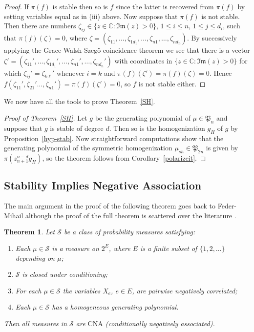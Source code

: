 \documentclass[10pt,reqno]{amsart}
\theoremstyle{plain}
\newtheorem{theorem}{Theorem}[section]
\theoremstyle{definition}
\theoremstyle{remark}
\newcommand{\CNA}{\text{CNA}}
\newcommand{\CC}{\mathbb{C}}
\renewcommand{\Im}{\mathfrak{Im}}
\newcommand{\fP}{\mathfrak{P}}
\begin{document}
\begin{proof}
If $\pi(f)$ is stable then so is $f$ since the latter is recovered from 
$\pi(f)$ by setting variables equal as in (iii) above. Now suppose that 
$\pi(f)$ is not stable. Then there are numbers 
$\zeta_{ij} \in \{z \in \CC : \Im(z)>0\}$, $1 \leq i \leq n$, 
$1 \leq j \leq d_i$, such 
that $\pi(f)(\zeta)=0$, where
$\zeta
=(\zeta_{11},\ldots,\zeta_{1d_1},\ldots,\zeta_{n1},\ldots,\zeta_{nd_n})$.
By successively applying the Grace-Walsh-Szeg\"o coincidence theorem we see 
that there is a vector $\zeta' = 
(\zeta_{11}',\ldots,\zeta_{1d_1}',\ldots,\zeta_{n1}',\ldots,\zeta_{nd_n}')$ 
with coordinates in $\{z \in \CC : \Im(z)>0\}$ for which $\zeta_{ij}'
= \zeta_{k\ell}'$ whenever $i=k$ and $\pi(f)(\zeta')=\pi(f)(\zeta)=0$. Hence 
$f(\zeta_{11}', \zeta_{21}' \ldots, \zeta_{n1}')=\pi(f)(\zeta')=0$, so $f$ is 
not stable either. 
\end{proof}

We now have all the tools to prove Theorem~\ref{SH}. 

\begin{proof}[Proof of Theorem~\ref{SH}]
Let $g$ be the generating polynomial of $\mu\in\fP_n$ and 
suppose that $g$ is stable of degree $d$. 
Then so is the homogenization $g_H$ of $g$ by Proposition~\ref{hyp-stab}. 
Now straightforward computations show that the generating polynomial of 
the symmetric homogenization $\mu_{sh}\in\fP_{2n}$ is given by
 $\pi(z_{n+1}^{n-d}g_H)$, so the theorem follows from 
Corollary~\ref{polarizeit}. 
\end{proof} 

\subsection{Stability Implies Negative Association}\label{s-sna}

The main argument in the proof of the following theorem goes back to 
Feder-Mihail \cite{feder} although the proof of the full theorem is scattered 
over the literature \cite{DJR,Lyons,Lyons-Peres,W}. 

\begin{theorem}\label{FM}
Let $\mathcal{S}$ be a class of probability measures satisfying: 
\begin{enumerate}
\item Each $\mu \in \mathcal{S}$ is a measure on $2^{E}$, where $E$ is a 
finite subset of $\{1,2,\ldots\}$ depending on $\mu$; 
\item $\mathcal{S}$ is closed under conditioning; 
\item For each $\mu \in \mathcal{S}$ the variables $X_e$, $e \in E$, 
are pairwise negatively correlated; 
\item Each $\mu \in \mathcal{S}$ has a homogeneous generating polynomial.  
\end{enumerate} 
Then all measures in $\mathcal{S}$ are $\CNA$ (conditionally negatively 
associated).
\end{theorem}
\end{document}
